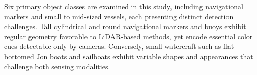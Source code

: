 \documentclass{erauthesis}
\begin{document}


Six primary object classes are examined in this study, including navigational markers and small to mid-sized vessels, each presenting distinct detection challenges. 
Tall cylindrical and round navigational markers and buoys exhibit regular geometry favorable to \ac{LiDAR}-based methods, yet encode essential color cues detectable only by cameras. 
Conversely, small watercraft such as flat-bottomed Jon boats and sailboats exhibit variable shapes and appearances that challenge both sensing modalities.


\end{document}
